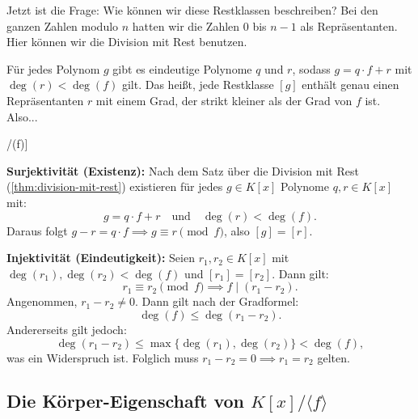 \begin{spoken-clean}[00:48:22 - 00:53:37]
Jetzt ist die Frage: Wie können wir diese Restklassen beschreiben? Bei den ganzen Zahlen modulo $n$ hatten wir die Zahlen $0$ bis $n-1$ als Repräsentanten. Hier können wir die Division mit Rest benutzen. 

Für jedes Polynom $g$ gibt es eindeutige Polynome $q$ und $r$, sodass $g = q \cdot f + r$ mit $\deg(r) < \deg(f)$ gilt. Das heißt, jede Restklasse $[g]$ enthält genau einen Repräsentanten $r$ mit einem Grad, der strikt kleiner als der Grad von $f$ ist. Also...
\end{spoken-clean}

\begin{math-stroke}[Repräsentantensystem für K[x]/(f)]

\begin{short-proof}
\textbf{Surjektivität (Existenz):} Nach dem Satz über die Division mit Rest (\cref{thm:division-mit-rest}) existieren für jedes $g \in K[x]$ Polynome $q, r \in K[x]$ mit:
\[
g = q \cdot f + r \quad \text{und} \quad \deg(r) < \deg(f).
\]
Daraus folgt $g - r = q \cdot f \implies g \equiv r \pmod f$, also $[g] = [r]$.

\textbf{Injektivität (Eindeutigkeit):} Seien $r_1, r_2 \in K[x]$ mit $\deg(r_1), \deg(r_2) < \deg(f)$ und $[r_1] = [r_2]$. Dann gilt:
\[
r_1 \equiv r_2 \pmod f \implies f \mid (r_1 - r_2).
\]
Angenommen, $r_1 - r_2 \neq 0$. Dann gilt nach der Gradformel:
\[
\deg(f) \le \deg(r_1 - r_2).
\]
Andererseits gilt jedoch:
\[
\deg(r_1 - r_2) \le \max\{\deg(r_1), \deg(r_2)\} < \deg(f),
\]
was ein Widerspruch ist. Folglich muss $r_1 - r_2 = 0 \implies r_1 = r_2$ gelten.
\end{short-proof}
\end{math-stroke}

\subsection{Die Körper-Eigenschaft von \texorpdfstring{$K[x]/\langle f \rangle$}{K[x]/(f)}}

